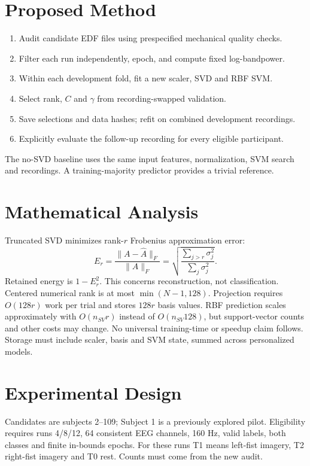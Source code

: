 \documentclass[conference]{IEEEtran}
\begin{document}
\section{Proposed Method}
\begin{enumerate}
\item Audit candidate EDF files using prespecified mechanical quality checks.
\item Filter each run independently, epoch, and compute fixed log-bandpower.
\item Within each development fold, fit a new scaler, SVD and RBF SVM.
\item Select rank, $C$ and $\gamma$ from recording-swapped validation.
\item Save selections and data hashes; refit on combined development recordings.
\item Explicitly evaluate the follow-up recording for every eligible participant.
\end{enumerate}
The no-SVD baseline uses the same input features, normalization, SVM search and
recordings. A training-majority predictor provides a trivial reference.

\section{Mathematical Analysis}
Truncated SVD minimizes rank-$r$ Frobenius approximation error\cite{ref11}:
\begin{equation}
E_r=\frac{\|A-\widehat A\|_F}{\|A\|_F}
=\sqrt{\frac{\sum_{j>r}\sigma_j^2}{\sum_j\sigma_j^2}}.
\end{equation}
Retained energy is $1-E_r^2$. This concerns reconstruction, not classification.
Centered numerical rank is at most $\min(N-1,128)$. Projection requires
$O(128r)$ work per trial and stores $128r$ basis values. RBF prediction scales
approximately with $O(n_{SV}r)$ instead of $O(n_{SV}128)$, but support-vector counts
and other costs may change. No universal training-time or speedup claim follows.
Storage must include scaler, basis and SVM state, summed across personalized models.

\section{Experimental Design}
Candidates are subjects 2--109; Subject 1 is a previously explored pilot.
Eligibility requires runs 4/8/12, 64 consistent EEG channels, 160 Hz, valid labels,
both classes and finite in-bounds epochs. For these runs T1 means left-fist imagery,
T2 right-fist imagery and T0 rest. Counts must come from the new audit.
\end{document}
